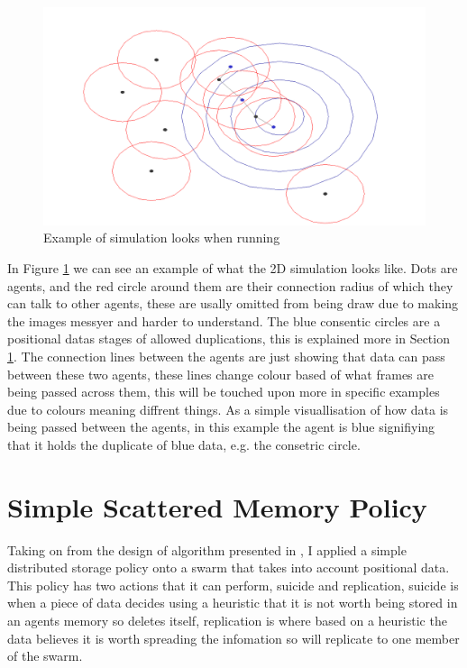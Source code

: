 \documentclass{UoYCSproject}
\begin{document}
\begin{figure}[htb]
\label{fig:Connarea}
\begin{center}
\centering
\includegraphics[width=\linewidth]{"./Connarea.png"}
\caption{Example of simulation looks when running}
\end{center}
\end{figure}

In Figure \ref{fig:Connarea} we can see an example of what the 2D simulation looks like.
Dots are agents, and the red circle around them are their connection radius of which they can talk to other agents, these are usally omitted from being draw due to making the images messyer and harder to understand.
The blue consentic circles are a positional datas stages of allowed duplications, this is explained more in Section \ref{sec:Simple1}.
The connection lines between the agents are just showing that data can pass between these two agents, these lines change colour based of what frames are being passed across them, this will be touched upon more in specific examples due to colours meaning diffrent things.
As a simple visuallisation of how data is being passed between the agents, in this example the agent is blue signifiying that it holds the duplicate of blue data, e.g. the consetric circle.



\section{Simple Scattered Memory Policy}
\label{sec:Simple1}

Taking on from the design of algorithm presented in \cite{Distributed Storage}, I applied a simple distributed storage policy onto a swarm that takes into account positional data.
This policy has two actions that it can perform, suicide and replication, suicide is when a piece of data decides using a heuristic that it is not worth being stored in an agents memory so deletes itself, replication is where based on a heuristic the data believes it is worth spreading the infomation so will replicate to one member of the swarm.
\end{document}

